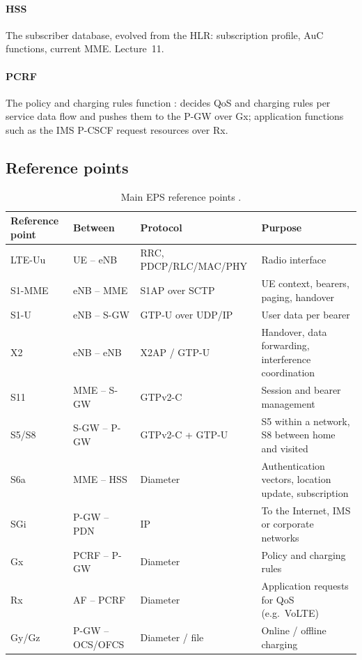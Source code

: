 \documentclass[11pt,a4paper]{article}
\begin{document}
\paragraph{HSS} The subscriber database, evolved from the HLR: subscription profile, AuC
functions, current MME. Lecture~11.

\paragraph{PCRF} The policy and charging rules function \cite{ts23203}: decides QoS and charging
rules per service data flow and pushes them to the P-GW over Gx; application functions such as the
IMS P-CSCF request resources over Rx.

\subsection{Reference points}
\begin{table}[htbp]
\centering\small
\caption{Main EPS reference points \cite{ts23401}.}\label{tab:ref}
\begin{tabularx}{\linewidth}{@{}l l l Y@{}}
\toprule
{}Reference point & Between & Protocol & Purpose \\
\midrule
LTE-Uu  & UE -- eNB     & RRC, PDCP/RLC/MAC/PHY & Radio interface \\
S1-MME  & eNB -- MME    & S1AP over SCTP        & UE context, bearers, paging, handover \\
S1-U    & eNB -- S-GW   & GTP-U over UDP/IP     & User data per bearer \\
X2      & eNB -- eNB    & X2AP / GTP-U          & Handover, data forwarding, interference coordination \\
S11     & MME -- S-GW   & GTPv2-C               & Session and bearer management \\
S5/S8   & S-GW -- P-GW  & GTPv2-C + GTP-U       & S5 within a network, S8 between home and visited \\
S6a     & MME -- HSS    & Diameter              & Authentication vectors, location update, subscription \\
SGi     & P-GW -- PDN   & IP                    & To the Internet, IMS or corporate networks \\
Gx      & PCRF -- P-GW  & Diameter              & Policy and charging rules \\
Rx      & AF -- PCRF    & Diameter              & Application requests for QoS (e.g.\ VoLTE) \\
Gy/Gz   & P-GW -- OCS/OFCS & Diameter / file    & Online / offline charging \\
\bottomrule
\end{tabularx}
\end{table}
\end{document}
